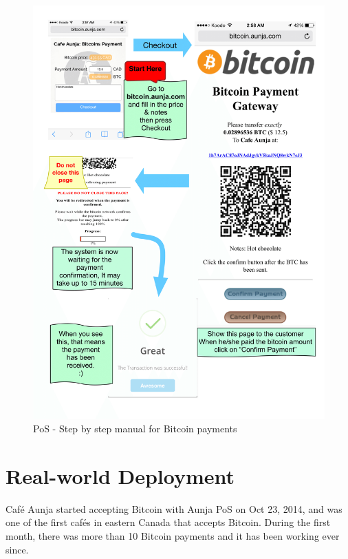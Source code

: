 \begin{figure}[htb!p]
\centering
\includegraphics[width=\linewidth]{fig/Payment_manual.png}
  \caption{PoS - Step by step manual for Bitcoin payments}
\label{fig:payment_manual}
\end{figure}



\section{Real-world Deployment}
Café Aunja started accepting Bitcoin with Aunja PoS on Oct 23, 2014, and was one of the first cafés in eastern Canada that accepts Bitcoin. During the first month, there was more than 10 Bitcoin payments and it has been working ever since.

